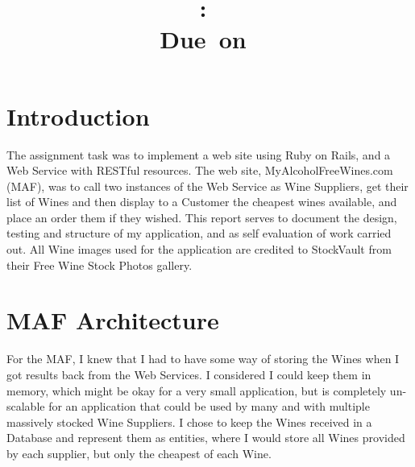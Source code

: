 \documentclass[12pt]{article}
\title{
\vspace{2in}
\textmd{\textbf{\hmwkClass:\ \hmwkTitle}}\\
\normalsize\vspace{0.1in}\small{Due\ on\ \hmwkDueDate}\\
\vspace{3in}
}
\author{\textbf{\hmwkAuthorName}}
\date{} %
\begin{document}
\maketitle



\newpage
\tableofcontents
\newpage



\section{Introduction}

The assignment task\cite{assignment} was to implement a web site using Ruby on Rails, and a Web Service with RESTful resources. The web site, MyAlcoholFreeWines.com (MAF), was to call two instances of the Web Service as Wine Suppliers, get their list of Wines and then display to a Customer the cheapest wines available, and place an order them if they wished. This report serves to document the design, testing and structure of my application, and as self evaluation of work carried out. All Wine images used for the application are credited to StockVault\cite{stockvault} from their Free Wine Stock Photos gallery.


\section{MAF Architecture}
For the MAF, I knew that I had to have some way of storing the Wines when I got results back from the Web Services. I considered I could keep them in memory, which might be okay for a very small application, but is completely un-scalable for an application that could be used by many and with multiple massively stocked Wine Suppliers. I chose to keep the Wines received in a Database and represent them as entities, where I would store all Wines provided by each supplier, but only the cheapest of each Wine.
\end{document}
